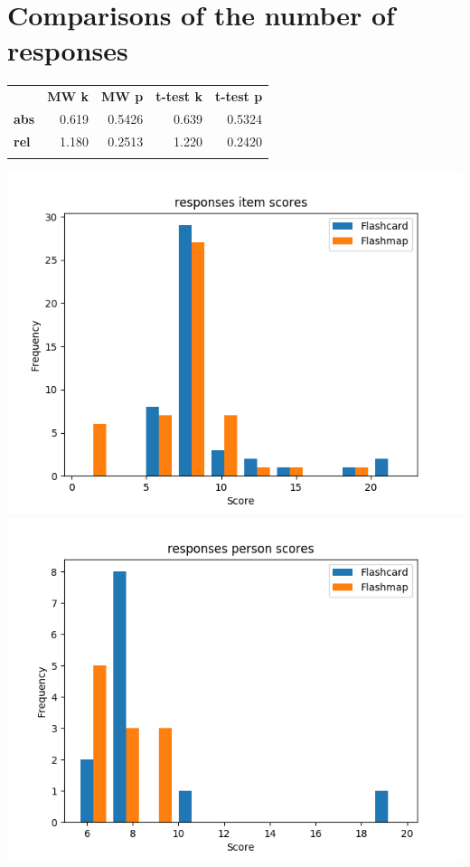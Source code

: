 \section{Comparisons of the number of responses}

\begin{longtable}[c]{@{}lrrrr@{}}
\toprule\addlinespace
& \textbf{MW k} & \textbf{MW p} &
\textbf{t-test k} & \textbf{t-test p}
\\\addlinespace
\midrule
\textbf{abs} & 0.619 & 0.5426 & 0.639 & 0.5324
\\\addlinespace
\textbf{rel} & 1.180 & 0.2513 & 1.220 & 0.2420
\\\addlinespace
\bottomrule
\end{longtable}

\includegraphics{img/responses_diff.png}
\includegraphics{img/responses_abil.png}

